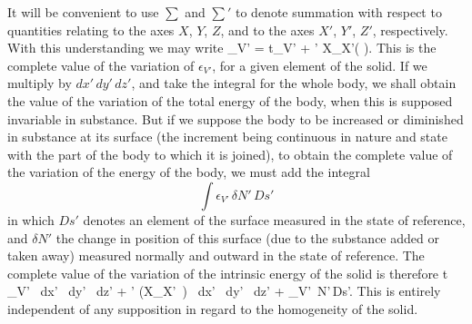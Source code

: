 \documentclass[12pt]{article}
\begin{document}
It will be convenient to use $\sum$ and $\sum\nolimits'$ to denote summation with respect to quantities relating to the axes $X$, $Y$, $Z$, and to the axes $X'$, $Y'$, $Z'$, respectively. With this understanding we may write
\eqs \delta \epsilon_{V'} = t\delta \eta_{V'} + \sum \sum\nolimits' X_{X'}\left(\delta {} \right). \label{356}\eqe
This is the complete value of the variation of $\epsilon_{V'}$, for a given element of the solid. If we multiply by $dx'\,dy'\,dz'$, and take the integral for the whole body, we shall obtain the value of the variation of the total energy of the body, when this is supposed invariable in substance. But if we suppose the body to be increased or diminished in substance at its surface (the increment being continuous in nature and state with the part of the body to which it is joined), to obtain the complete value of the variation of the energy of the body, we must add the integral
$$\int \epsilon_{V'}\,\delta N'\,Ds'$$
in which $Ds'$ denotes an element of the surface measured in the state of reference, and $\delta N'$ the change in position of this surface (due to the substance added or taken away) measured normally and outward in the state of reference. The complete value of the variation of the intrinsic energy of the solid is therefore
\eqs \int \int \int t \delta \eta_{V'} \, dx' \, dy' \, dz' + \int \int \int  \sum \sum\nolimits' \left(X_{X'}\, \delta {} \right) \, dx' \, dy' \, dz' + \int \epsilon_{V'} \,\delta N'\,Ds'. \label{357}\eqe
This is entirely independent of any supposition in regard to the homogeneity of the solid.
\end{document}

